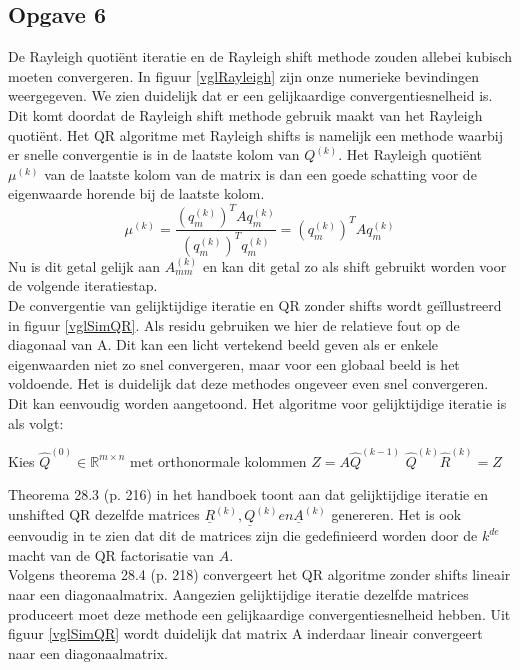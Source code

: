 \documentclass[a4paper, 12pt, titlepage]{report}
\begin{document}
\subsection{Opgave 6}
De Rayleigh quoti\"ent iteratie en de Rayleigh shift methode zouden allebei kubisch moeten convergeren. In figuur \ref{vglRayleigh} zijn onze numerieke bevindingen weergegeven. We zien duidelijk dat er een gelijkaardige convergentiesnelheid is. Dit komt doordat de Rayleigh shift methode gebruik maakt van het Rayleigh quoti\"ent. Het QR algoritme met Rayleigh shifts is namelijk een methode waarbij er snelle convergentie is in de laatste kolom van $Q^{(k)}$. Het Rayleigh quoti\"ent $\mu^{(k)}$ van de laatste kolom van de matrix is dan een goede schatting voor de eigenwaarde horende bij de laatste kolom. 
\begin{equation}
	\mu^{(k)} = \frac{(q^{(k)}_m)^TAq^{(k)}_m}{(q^{(k)}_m)^Tq^{(k)}_m} = (q^{(k)}_m)^TAq^{(k)}_m
	\label{eqn:rayleighquotient}
\end{equation}
Nu is dit getal gelijk aan $A^{(k)}_{mm}$ en kan dit getal zo als shift gebruikt worden voor de volgende iteratiestap.\\

De convergentie van gelijktijdige iteratie en QR zonder shifts wordt ge\"illustreerd in figuur \ref{vglSimQR}. Als residu gebruiken we hier de relatieve fout op de diagonaal van A. Dit kan een licht vertekend beeld geven als er enkele eigenwaarden niet zo snel convergeren, maar voor een globaal beeld is het voldoende. Het is duidelijk dat deze methodes ongeveer even snel convergeren. Dit kan eenvoudig worden aangetoond. Het algoritme voor gelijktijdige iteratie is als volgt:

\begin{algorithmic}
 \STATE Kies $\hat{Q}^{(0)}\in \mathbb{R}^{m\times n}$ met orthonormale kolommen
 	\STATE $Z = A\hat{Q}^{(k-1)}$
 	\STATE $\hat{Q}^{(k)}\hat{R}^{(k)} = Z$
 \ENDFOR
\end{algorithmic}

Theorema 28.3 (p. 216) in het handboek toont aan dat gelijktijdige iteratie en unshifted QR dezelfde matrices $\underline{R}^{(k)},\underline{Q}^{(k)} en \underline{A}^{(k)}$ genereren. Het is ook eenvoudig in te zien dat dit de matrices zijn die gedefinieerd worden door de $k^{de}$ macht van de QR factorisatie van $A$.\\

Volgens theorema 28.4 (p. 218) convergeert het QR algoritme zonder shifts lineair naar een diagonaalmatrix. Aangezien gelijktijdige iteratie dezelfde matrices produceert moet deze methode een gelijkaardige convergentiesnelheid hebben. Uit figuur \ref{vglSimQR} wordt duidelijk dat matrix A inderdaar lineair convergeert naar een diagonaalmatrix.
\end{document}
